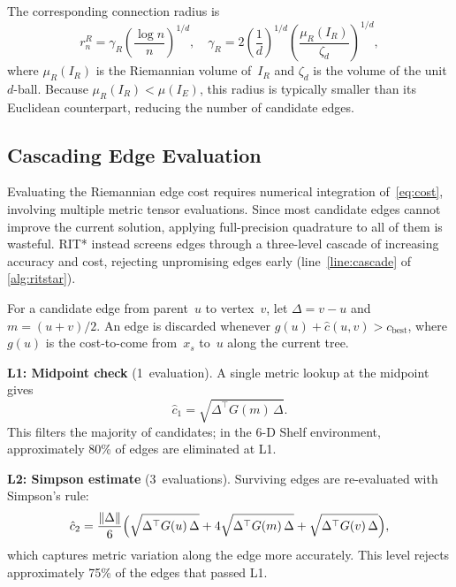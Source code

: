\documentclass[journal]{IEEEtran}
\newcommand{\IR}{I_{\!R}}
\newcommand{\IE}{I_{\!E}}
\newcommand{\muR}{\mu_{\!R}}
\begin{document}
The corresponding connection radius is
\begin{equation}\label{eq:radius}
  r_n^R = \gamma_R \!\left(\frac{\log n}{n}\right)^{\!1/d}\!,\quad
  \gamma_R = 2\!\left(\frac{1}{d}\right)^{\!1/d}
             \!\left(\frac{\muR(\IR)}{\zeta_d}\right)^{\!1/d},
\end{equation}
where $\muR(\IR)$ is the Riemannian volume of~$\IR$ and $\zeta_d$ is
the volume of the unit $d$-ball. Because $\muR(\IR) < \mu(\IE)$, this
radius is typically smaller than its Euclidean counterpart, reducing the
number of candidate edges.



\subsection{Cascading Edge Evaluation}\label{sec:cascade}

Evaluating the Riemannian edge cost requires numerical integration
of~\eqref{eq:cost}, involving multiple metric tensor evaluations.
Since most candidate edges cannot improve the current solution,
applying full-precision quadrature to all of them is wasteful. RIT*
instead screens edges through a three-level cascade of increasing
accuracy and cost, rejecting unpromising edges early
(line~\ref{line:cascade} of \cref{alg:ritstar}).

For a candidate edge from parent~$u$ to vertex~$v$, let
$\Delta = v - u$ and $m = (u+v)/2$. An edge is discarded whenever
$g(u) + \hat{c}(u,v) > c_{\mathrm{best}}$, where $g(u)$ is the
cost-to-come from~$x_s$ to~$u$ along the current tree.

\textbf{L1: Midpoint check} (1~evaluation).
A single metric lookup at the midpoint gives
\begin{equation}\label{eq:l1}
  \hat{c}_1 = \sqrt{\Delta^\top G(m)\,\Delta}.
\end{equation}
This filters the majority of candidates; in the 6-D Shelf
environment, approximately 80\% of edges are eliminated at L1.

\textbf{L2: Simpson estimate} (3~evaluations).
Surviving edges are re-evaluated with Simpson's rule:
\begin{equation}\label{eq:simpson}
  \hat{c}_2 = \frac{\|\Delta\|}{6}\Bigl(
    \sqrt{\Delta^\top G(u)\,\Delta}
    + 4\sqrt{\Delta^\top G(m)\,\Delta}
    + \sqrt{\Delta^\top G(v)\,\Delta}\Bigr),
\end{equation}
which captures metric variation along the edge more accurately.
This level rejects approximately 75\% of the edges that passed L1.
\end{document}
